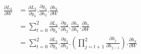 \begin{align*}
\frac{\partial{L_{3}}}{\partial{W}} &= \frac{\partial{L_{3}}}{\partial{y_{3}}}.\frac{\partial{y_{3}}}{\partial{h_{2}}}.\frac{\partial{h_{2}}}{\partial{W}}\\
&= \sum_{t=0}^{2} \frac{\partial{L_{3}}}{\partial{y_{3}}}.\frac{\partial{y_{3}}}{\partial{h_{2}}}.\frac{\partial{h_{2}}}{\partial{h_{t}}}.\frac{\partial{h_{t}}}{\partial{W}}\\
&= \sum_{t=0}^{2} \frac{\partial{L_{3}}}{\partial{y_{3}}}.\frac{\partial{y_{3}}}{\partial{h_2}}.\left ( \prod_{j=t+1}^{2} \frac{\partial{h_{j}}}{\partial{h_{j-1}}}\right ).\frac{\partial{h_{k}}}{\partial{W}}
\end{align*}


